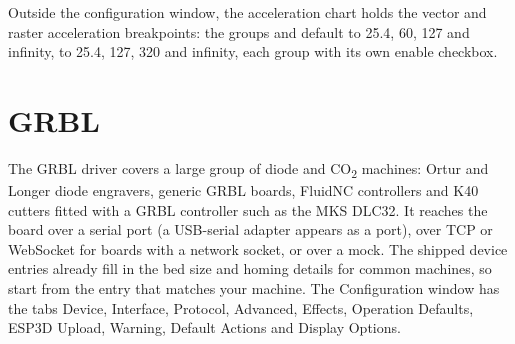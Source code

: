 Outside the configuration window, the acceleration chart holds the vector and
raster acceleration breakpoints: the groups  and 
default to 25.4, 60, 127 and infinity,  to 25.4, 127, 320
and infinity, each group with its own enable checkbox.

\section*{GRBL}

The GRBL driver covers a large group of diode and CO\textsubscript{2} machines:
Ortur and Longer diode engravers, generic GRBL boards, FluidNC controllers and
K40 cutters fitted with a GRBL controller such as the MKS DLC32. It reaches the
board over a serial port (a USB-serial adapter appears as a port), over TCP or
WebSocket for boards with a network socket, or over a mock. The shipped device
entries already fill in the bed size and homing details for common machines, so
start from the entry that matches your machine. The Configuration window has the
tabs Device, Interface, Protocol, Advanced, Effects, Operation Defaults, ESP3D
Upload, Warning, Default Actions and Display Options.

